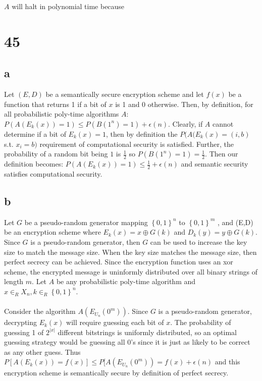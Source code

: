 \documentclass[letterpaper,notitlepage,twoside]{article}
\begin{document}
$A$ will halt in polynomial time because \\

\section*{45}
\subsection*{a}
Let $(E, D)$ be a semantically secure encryption scheme and let $f(x)$ be a function that returns 1 if a bit of $x$ is 1 and 0 otherwise.
Then, by definition, for all probabilistic poly-time algorithms $A$: $P(A(E_k(x)) = 1) \leq P(B(1^{n}) = 1) + \epsilon(n)$.
Clearly, if $A$ cannot determine if a bit of $E_k(x) = 1$, then by definition the $P(A(E_k(x) = (i,b)$ s.t. $x_i = b)$ requirement of computational security is satisfied. 
Further, the probability of a random bit being $1$ is $\frac{1}{2}$ so $P(B(1^{n}) = 1) = \frac{1}{2}$. 
Then our definition becomes: $P(A(E_k(x)) = 1) \leq \frac{1}{2} + \epsilon(n)$ and semantic security satisfies computational security.

\subsection*{b}
Let $G$ be a pseudo-random generator mapping $\left\{0, 1\right\}^n$ to $\left\{0, 1\right\}^m$ , and (E,D) be an encryption scheme where $E_k(x) = x \oplus G(k)$ and $D_k(y) = y \oplus G(k)$. Since $G$ is a pseudo-random generator, then $G$ can be used to increase the key size to match the message size. When the key size matches the message size, then perfect secrecy can be achieved. Since the encryption function uses an xor scheme, the encrypted message is uninformly distributed over all binary strings of length $m$. Let $A$ be any probabilistic poly-time algorithm and $x \in_R X_n,k \in_R \left\{0,1\right\}^n$.
\\\\
Consider the algorithm $A(E_{U_n}(0^m))$. Since $G$ is a pseudo-random generator, decrypting $E_k(x)$ will require guessing each bit of $x$. The probability of guessing 1 of $2^{|x|}$ different bitstrings is uniformly distributed, so an optimal guessing strategy would be guessing all 0's since it is just as likely to be correct as any other guess. Thus $P[A(E_k(x))=f(x)] \le P[A(E_{U_n}(0^m)) = f(x) + \epsilon(n)$ and this encryption scheme is semantically secure by definition of perfect secrecy.
\end{document}
